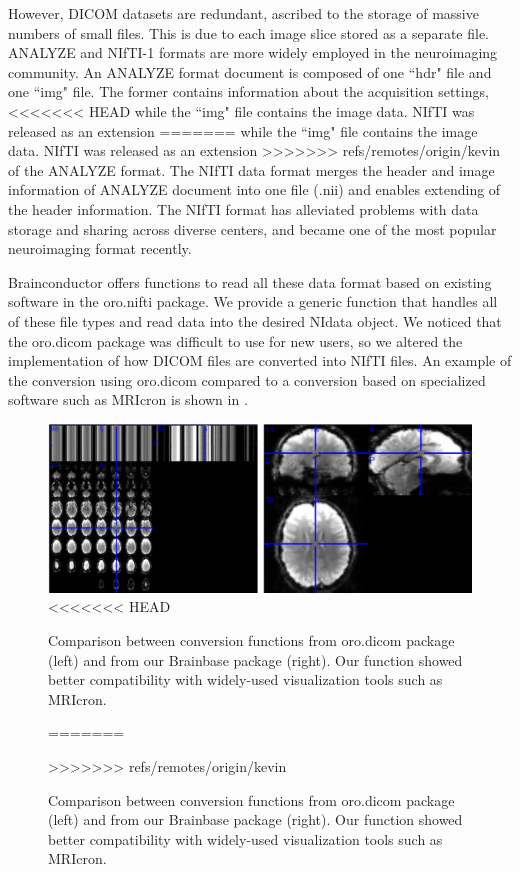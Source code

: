 \documentclass{nature}
\begin{document}
However, DICOM datasets are redundant, ascribed to the storage of massive
numbers of small files. This is due to each image slice stored as a separate
file. ANALYZE and NIfTI-1 formats are more widely employed in the neuroimaging
community. An ANALYZE format document is composed of one ``hdr" file and one
``img" file. The former contains information about the acquisition settings,
<<<<<<< HEAD
while the ``img" file contains the image data. NIfTI was released as an extension
=======
while the ``img" file contains the image data. NIfTI was released as an
extension
>>>>>>> refs/remotes/origin/kevin
of the ANALYZE format. The NIfTI data format merges the header and image
information of ANALYZE document into one file (.nii) and enables extending of
the header information. The NIfTI format has alleviated problems with data
storage and sharing across diverse centers, and became one of the most popular
neuroimaging format recently.

Brainconductor offers functions to read all these data format
based on existing software in the oro.nifti package. We
provide a generic function that handles all of these file types and read data
into the desired NIdata object.
We noticed that the oro.dicom package was difficult to use for new users, so
we altered the implementation of how DICOM files are converted into NIfTI 
files. An example of the conversion using oro.dicom compared to a conversion
based on specialized software such as MRIcron\cite{rorden2011mricro} is
shown in .

\begin{figure}[tb]
\centering
\includegraphics[width=400pt]{fig/brainconductor/dicom.png}
<<<<<<< HEAD
\caption{Comparison between conversion functions from oro.dicom package (left) and from our Brainbase  package (right).  Our function showed better compatibility  with widely-used visualization tools such as MRIcron.}
=======
\caption{Comparison between conversion functions from oro.dicom package (left)
and from our Brainbase  package (right).  Our function showed better
compatibility  with widely-used visualization tools such as MRIcron.}
>>>>>>> refs/remotes/origin/kevin
\label{fig:dicom}
\end{figure}
\end{document}
